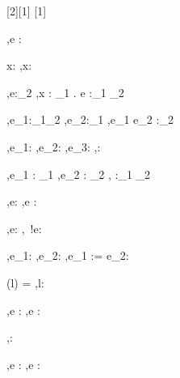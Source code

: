 


\newif\ifstateful
\statefulfalse
{}[2][1]
  {
    {\ifstateful{,\:s#2}\else{}\fi}
    {\ifstateful{,\:[#1]s#2}\else{}\fi}}
[1]
  {\ifstateful{,\:\Sigma#1}\else{}\fi}





  {\Gamma,\Sigma \infers e : \tau}


  {x:\tau\in\Gamma}
  {\Gamma,\Sigma\infers x:\tau}


  {\Gamma[x:\tau_1] ,\Sigma \infers e:\tau_2}
  {\Gamma,\Sigma \infers \lambda x : \tau_1 . e :\tau_1 \to \tau_2}

  {\Gamma,\Sigma \infers e_1:\tau_1\to\tau_2 \Quad
   \Gamma,\Sigma \infers e_2:\tau_1}
  {\Gamma,\Sigma \infers e_1 e_2 :\tau_2}


  {\Gamma,\Sigma \infers e_1:\Bool \Quad
   \Gamma,\Sigma \infers e_2:\tau \Quad
   \Gamma,\Sigma \infers e_3:\tau}
  {\Gamma,\Sigma \infers {}:\tau}


    {\Gamma,\Sigma \infers e_1 : \tau_1  \Quad
     \Gamma,\Sigma \infers e_2 : \tau_2}
    {\Gamma,\Sigma \infers {} :\tau_1 \times \tau_2}


  {\Gamma,\Sigma \infers e:\tau}
  {\Gamma,\Sigma \infers \Ref e :\Reference \tau}

  {\Gamma,\Sigma \infers e:\Reference \tau}
  {\Gamma,\Sigma\infers\ !e:\tau}

  {\Gamma,\Sigma\infers e_1:\Reference \tau \Quad
   \Gamma,\Sigma\infers e_2:\tau}
  {\Gamma,\Sigma\infers e_1 := e_2:\Unit}

  {\Sigma(l) = \tau}
  {\Gamma,\Sigma\infers l:\Reference \tau}


  {\Gamma,\Sigma \infers e : \tau}
  {\Gamma,\Sigma \infers \Edit e : \Task \tau}

  {}
  {\Gamma,\Sigma \infers \Enter \tau : \Task \tau}

  {\Gamma,\Sigma \infers e : \Reference \tau}
  {\Gamma,\Sigma \infers \Update e : \Task \tau}


